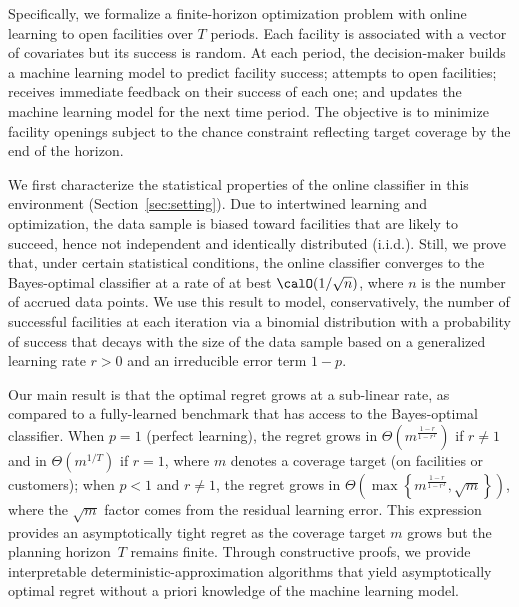 \documentclass[blindrev]{informs3noheader}
\begin{document}
Specifically, we formalize a finite-horizon optimization problem with online learning to open facilities over $T$ periods. Each facility is associated with a vector of covariates but its success is random. At each period, the decision-maker builds a machine learning model to predict facility success; attempts to open facilities; receives immediate feedback on their success of each one; and updates the machine learning model for the next time period. The objective is to minimize facility openings subject to the chance constraint reflecting target coverage by the end of the horizon.

We first characterize the statistical properties of the online classifier in this environment (Section~\ref{sec:setting}). Due to intertwined learning and optimization, the data sample is biased toward facilities that are likely to succeed, hence not independent and identically distributed (i.i.d.). Still, we prove that, under certain statistical conditions, the online classifier converges to the Bayes-optimal classifier at a rate of at best $\calO(1/\sqrt n)$, where $n$ is the number of accrued data points. We use this result to model, conservatively, the number of successful facilities at each iteration via a binomial distribution with a probability of success that decays with the size of the data sample based on a generalized learning rate $r>0$ and an irreducible error term $1-p$.

Our main result is that the optimal regret grows at a sub-linear rate, as compared to a fully-learned benchmark that has access to the Bayes-optimal classifier. When $p=1$ (perfect learning), the regret grows in $\Theta\left(m^{\frac{1-r}{1-r^T}}\right)$ if $r\neq1$ and in $\Theta\left(m^{1/T}\right)$ if $r=1$, where $m$ denotes a coverage target (on facilities or customers); when $p<1$ and $r\neq1$, the regret grows in $\Theta\left(\max\left\{m^{\frac{1-r}{1-r^T}},\sqrt{m}\right\}\right)$, where the $\sqrt{m}$ factor comes from the residual learning error. This expression provides an asymptotically tight regret as the coverage target $m$ grows but the planning horizon~$T$ remains finite. Through constructive proofs, we provide interpretable deterministic-approximation algorithms that yield asymptotically optimal regret without a priori knowledge of the machine learning model.
\end{document}
